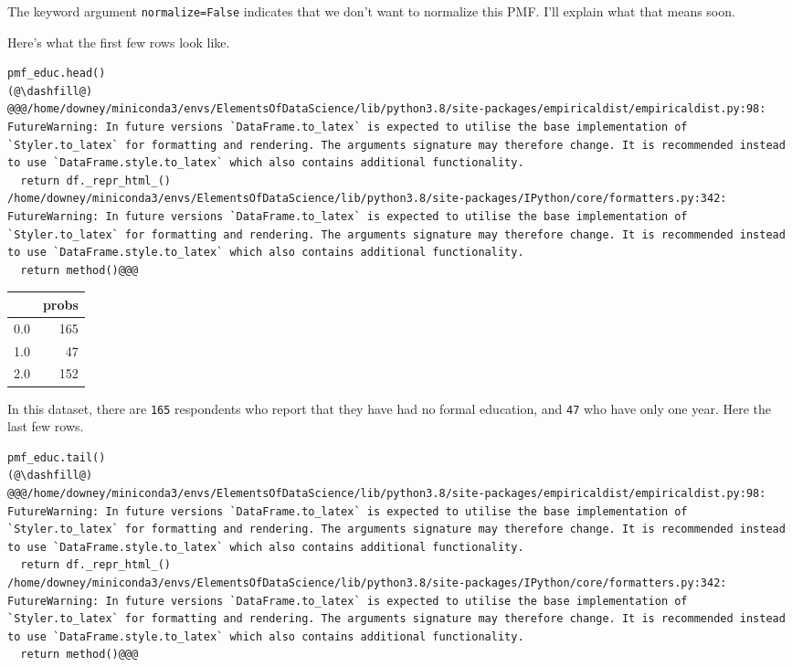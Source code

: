 The keyword argument \passthrough{\lstinline!normalize=False!} indicates
that we don't want to normalize this PMF. I'll explain what that means
soon.

Here's what the first few rows look like.

\begin{lstlisting}[]
pmf_educ.head()
(@\dashfill@)
@@@/home/downey/miniconda3/envs/ElementsOfDataScience/lib/python3.8/site-packages/empiricaldist/empiricaldist.py:98: FutureWarning: In future versions `DataFrame.to_latex` is expected to utilise the base implementation of `Styler.to_latex` for formatting and rendering. The arguments signature may therefore change. It is recommended instead to use `DataFrame.style.to_latex` which also contains additional functionality.
  return df._repr_html_()
/home/downey/miniconda3/envs/ElementsOfDataScience/lib/python3.8/site-packages/IPython/core/formatters.py:342: FutureWarning: In future versions `DataFrame.to_latex` is expected to utilise the base implementation of `Styler.to_latex` for formatting and rendering. The arguments signature may therefore change. It is recommended instead to use `DataFrame.style.to_latex` which also contains additional functionality.
  return method()@@@
\end{lstlisting}

\begin{tabular}{lr}
\midrule
{} &  probs \\
\midrule
0.0 &    165 \\
1.0 &     47 \\
2.0 &    152 \\
\midrule
\end{tabular}

In this dataset, there are \passthrough{\lstinline!165!} respondents who
report that they have had no formal education, and
\passthrough{\lstinline!47!} who have only one year. Here the last few
rows.

\begin{lstlisting}[]
pmf_educ.tail()
(@\dashfill@)
@@@/home/downey/miniconda3/envs/ElementsOfDataScience/lib/python3.8/site-packages/empiricaldist/empiricaldist.py:98: FutureWarning: In future versions `DataFrame.to_latex` is expected to utilise the base implementation of `Styler.to_latex` for formatting and rendering. The arguments signature may therefore change. It is recommended instead to use `DataFrame.style.to_latex` which also contains additional functionality.
  return df._repr_html_()
/home/downey/miniconda3/envs/ElementsOfDataScience/lib/python3.8/site-packages/IPython/core/formatters.py:342: FutureWarning: In future versions `DataFrame.to_latex` is expected to utilise the base implementation of `Styler.to_latex` for formatting and rendering. The arguments signature may therefore change. It is recommended instead to use `DataFrame.style.to_latex` which also contains additional functionality.
  return method()@@@
\end{lstlisting}

